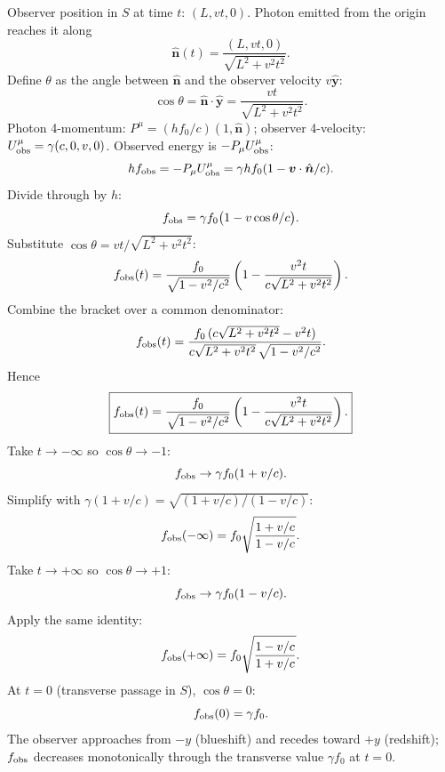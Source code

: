 \documentclass[11pt]{article}
\begin{document}
Observer position in $S$ at time $t$: $(L,vt,0)$. Photon emitted from the origin reaches it along
\[ \hat{\bm n}(t) = \frac{(L,vt,0)}{\sqrt{L^2+v^2t^2}}. \]
Define $\theta$ as the angle between $\hat{\bm n}$ and the observer velocity $v\hat{\bm y}$:
\[ \cos\theta = \hat{\bm n}\cdot\hat{\bm y} = \frac{vt}{\sqrt{L^2+v^2 t^2}}. \]
Photon 4-momentum: $P^\mu = (hf_0/c)(1,\hat{\bm n})$; observer 4-velocity: $U^\mu_{\rm obs} = \gamma(c,0,v,0)$. Observed energy is $-P_\mu U^\mu_{\rm obs}$:
\[ hf_{\rm obs} = -P_\mu U^\mu_{\rm obs} = \gamma hf_0(1 - \bm v\cdot\hat{\bm n}/c). \]
Divide through by $h$:
\[ f_{\rm obs} = \gamma f_0\bigl(1 - v\cos\theta/c\bigr). \]
Substitute $\cos\theta = vt/\sqrt{L^2+v^2t^2}$:
\[ f_{\rm obs}(t) = \frac{f_0}{\sqrt{1-v^2/c^2}}\left(1 - \frac{v^2 t}{c\sqrt{L^2+v^2 t^2}}\right). \]
Combine the bracket over a common denominator:
\[ f_{\rm obs}(t) = \frac{f_0\,(c\sqrt{L^2+v^2 t^2} - v^2 t)}{c\sqrt{L^2+v^2 t^2}\,\sqrt{1-v^2/c^2}}. \]
Hence
\begin{equation}
\boxed{f_{\rm obs}(t) = \frac{f_0}{\sqrt{1-v^2/c^2}}\left(1 - \frac{v^2 t}{c\sqrt{L^2+v^2 t^2}}\right).}
\label{eq:Q2b-fobs}
\end{equation}
Take $t\to-\infty$ so $\cos\theta\to-1$:
\[ f_{\rm obs}\to \gamma f_0(1+v/c). \]
Simplify with $\gamma(1+v/c) = \sqrt{(1+v/c)/(1-v/c)}$:
\[ f_{\rm obs}(-\infty) = f_0\sqrt{\frac{1+v/c}{1-v/c}}. \]
Take $t\to+\infty$ so $\cos\theta\to+1$:
\[ f_{\rm obs}\to \gamma f_0(1-v/c). \]
Apply the same identity:
\[ f_{\rm obs}(+\infty) = f_0\sqrt{\frac{1-v/c}{1+v/c}}. \]
At $t=0$ (transverse passage in $S$), $\cos\theta=0$:
\[ f_{\rm obs}(0) = \gamma f_0. \]
The observer approaches from $-y$ (blueshift) and recedes toward $+y$ (redshift); $f_{\rm obs}$ decreases monotonically through the transverse value $\gamma f_0$ at $t=0$.

\begin{center}
\end{center}
\end{document}
